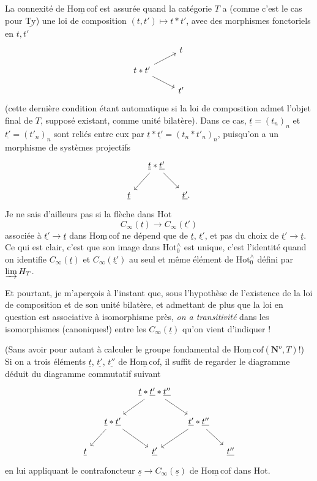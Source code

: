 \documentclass[11pt]{article}
\newcommand{\printedpage}[1]{\marginpar{\footnotesize p.~#1}}
\newcommand{\msp}[1]{\marginpar{\footnotesize [#1]}}
\newcommand{\Hotz}{\mathrm{Hot}^{\wedge}_{0}}
\newcommand{\Hc}{\underline{\mathrm{Hom\,cof}}}
\newcommand{\No}{\mathbf{N}^o}
\begin{document}
La connexité de $\Hc$ est assurée quand la catégorie $T$ a (comme c'est le cas pour $\underline{\mathrm{Ty}}$) une loi de composition $(t,t') \longmapsto t * t'$, avec des morphismes fonctoriels en $t, t'$
\[
\begin{tikzcd}[row sep=small]
 & t \\
t * t' \arrow[ru] \arrow[rd] & \\
 & t'
\end{tikzcd}
\]
(cette dernière condition étant automatique
\printedpage{75}
\msp{page 119}
si la loi de composition admet l'objet final de $T$, supposé existant, comme unité bilatère). Dans ce cas, $\underline{t} = (t_n)_n$ et $\underline{t'} = (t'_n)_n$ sont reliés entre eux par $\underline{t} * \underline{t'} = (t_n * t'_n)_n$, puisqu'on a un morphisme de systèmes projectifs
\[
\begin{tikzcd}[column sep=small]
 & \underline{t} * \underline{t'} \arrow[ld] \arrow[rd] & \\
\underline{t} & & \underline{t'}.
\end{tikzcd}
\]
Je ne sais d'ailleurs pas si la flèche dans Hot
\[
C_\infty(\underline{t}) \longrightarrow C_\infty(\underline{t'})
\]
associée à $\underline{t'} \longrightarrow \underline{t}$ dans $\Hc$ ne dépend que de $\underline{t}$, $\underline{t'}$, et pas du choix de $\underline{t'} \longrightarrow \underline{t}$. Ce qui est clair, c'est que son image dans $\Hotz$ est unique, c'est l'identité quand on identifie $C_\infty(\underline{t})$ et $C_\infty(\underline{t'})$ au seul et même élément de $\Hotz$ défini par $\varinjlim H_T$.

Et pourtant, je m'aperçois à l'instant que, sous l'hypothèse de l'existence de la loi de composition et de son unité bilatère, et admettant de plus que la loi en question est associative à isomorphisme près, \textit{on a transitivité} dans les isomorphismes (canoniques!) entre les $C_\infty(\underline{t})$ qu'on vient d'indiquer !

\msp{page 120}
(Sans avoir pour autant à calculer le groupe fondamental de $\Hc(\No, T)$!) Si on a trois éléments $\underline{t}$, $\underline{t'}$, $\underline{t''}$ de $\Hc$, il suffit de regarder le diagramme déduit du diagramme commutatif suivant
\[
\begin{tikzcd}[column sep=small]
 & & \underline{t} * \underline{t'} * \underline{t''} \arrow[ld] \arrow[rd] & & \\
 & \underline{t} * \underline{t'} \arrow[ld] \arrow[rd] & & \underline{t'} * \underline{t''} \arrow[ld] \arrow[rd] & \\
\underline{t} & & \underline{t'} & & \underline{t''}
\end{tikzcd}
\]
en lui appliquant le contrafoncteur $\underline{s} \longrightarrow C_\infty(\underline{s})$ de $\Hc$ dans Hot.
\end{document}
